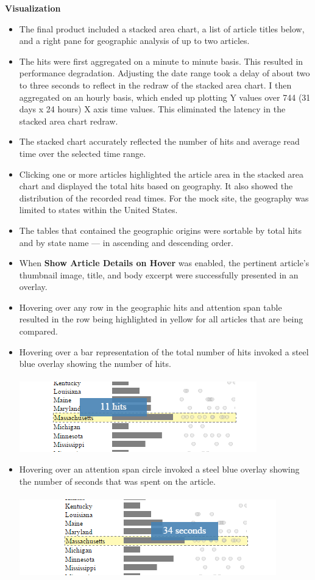 \documentclass[12pt]{article}
\begin{document}
{\noindent\textbf{Visualization} 
\begin{itemize}
\item The final product included a stacked area chart, a list of article titles below, and a right pane for geographic analysis of up to two articles.
\item The hits were first aggregated on a minute to minute basis. This resulted in performance degradation. Adjusting the date range took a delay of about two to three seconds to reflect in the redraw of the stacked area chart. I then aggregated on an hourly basis, which ended up plotting Y values over 744 (31 days x 24 hours) X axis time values. This eliminated the latency in the stacked area chart redraw.
\item The stacked chart accurately reflected the number of hits and average read time over the selected time range.
\item Clicking one or more articles highlighted the article area in the stacked area chart and displayed the total hits based on geography. It also showed the distribution of the recorded read times. For the mock site, the geography was limited to states within the United States.
\item The tables that contained the geographic origins were sortable by total hits and by state name --- in ascending and descending order.
\item When \textbf{Show Article Details on Hover} was enabled, the pertinent article's thumbnail image, title, and body excerpt were successfully presented in an overlay.
\item Hovering over any row in the geographic hits and attention span table resulted in the row being highlighted in yellow for all articles that are being compared.
\item Hovering over a bar representation of the total number of hits invoked a steel blue overlay showing the number of hits.
\\ \\
\noindent\includegraphics[scale=0.8]{img/state_hit_hover} \\  

\item Hovering over an attention span circle invoked a steel blue overlay showing the number of seconds that was spent on the article.
\\ \\
\noindent\includegraphics[scale=0.8]{img/state_circle_hover} \\  
\end{itemize} 

}
\end{document}
